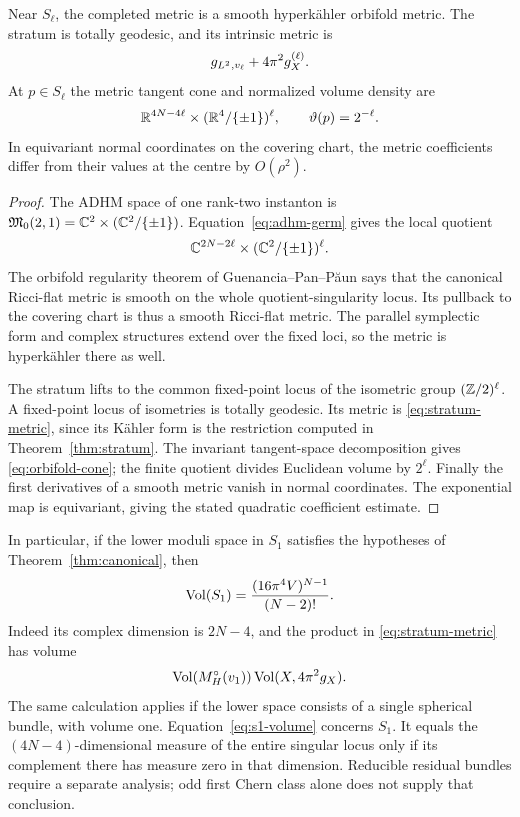 \begin{theorem}\label{thm:orbifold}
Near $S_\ell$, the completed metric is a smooth hyperk\"ahler orbifold
metric. The stratum is totally geodesic, and its intrinsic metric is
\begin{equation}\label{eq:stratum-metric}
 g_{L^2}{}_{,v_\ell}+4\pi^2g_X^{(\ell)}.
\end{equation}
At $p\in S_\ell$ the metric tangent cone and normalized volume density are
\begin{equation}\label{eq:orbifold-cone}
 \mathbb R^{4N-4\ell}\times(\mathbb R^4/\{\pm1\})^\ell,
 \qquad \vartheta(p)=2^{-\ell}.
\end{equation}
In equivariant normal coordinates on the covering chart, the metric
coefficients differ from their values at the centre by $O(\rho^2)$.
\end{theorem}
\begin{proof}
The ADHM space of one rank-two instanton is
$\mathfrak M_0(2,1)=\mathbb C^2\times(\mathbb C^2/\{\pm1\})$.
Equation~\eqref{eq:adhm-germ} gives the local quotient
\[
 \mathbb C^{2N-2\ell}\times(\mathbb C^2/\{\pm1\})^\ell.
\]
The orbifold regularity theorem of Guenancia--Pan--P\u aun
\cite[Corollary~B]{GPP25} says that the canonical Ricci-flat metric is
smooth on the whole quotient-singularity locus. Its pullback to the
covering chart is thus a smooth Ricci-flat metric. The parallel symplectic
form and complex structures extend over the fixed loci, so the metric is
hyperk\"ahler there as well.

The stratum lifts to the common fixed-point locus of the isometric group
$(\mathbb Z/2)^\ell$. A fixed-point locus of isometries is totally geodesic.
Its metric is \eqref{eq:stratum-metric}, since its K\"ahler form is the
restriction computed in Theorem~\ref{thm:stratum}.
The invariant tangent-space decomposition gives \eqref{eq:orbifold-cone};
the finite quotient divides Euclidean volume by $2^\ell$.
Finally the first derivatives of a smooth metric vanish in normal
coordinates. The exponential map is equivariant, giving the stated
quadratic coefficient estimate.
\end{proof}

In particular, if the lower moduli space in $S_1$ satisfies the hypotheses
of Theorem~\ref{thm:canonical}, then
\begin{equation}\label{eq:s1-volume}
 \operatorname{Vol}(S_1)=\frac{(16\pi^4V)^{N-1}}{(N-2)!}.
\end{equation}
Indeed its complex dimension is $2N-4$, and the product in
\eqref{eq:stratum-metric} has volume
\[\operatorname{Vol}(M^{\circ}_H(v_1))\operatorname{Vol}(X,4\pi^2g_X).\]
The same calculation applies if the lower space consists of a single
spherical bundle, with volume one.
Equation~\eqref{eq:s1-volume} concerns $S_1$. It equals the
$(4N-4)$-dimensional measure of the entire singular locus only if its
complement there has measure zero in that dimension. Reducible residual
bundles require a separate analysis; odd first Chern class alone does not
supply that conclusion.

